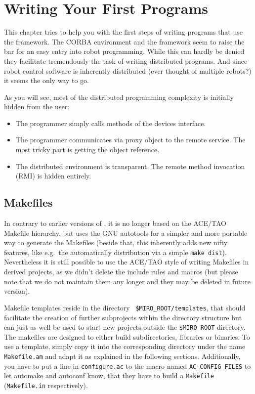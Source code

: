 \chapter{Writing Your First Programs}

This chapter tries to help you with the first steps of writing
programs that use the \miro framework. The CORBA environment and the
\miro framework seem to raise the bar for an easy entry into robot
programming. While this can hardly be denied they facilitate
tremendously the task of writing distributed programs. And since robot
control software is inherently distributed (ever thought of multiple
robots?) it seems the only way to go.

As you will see, most of the distributed programming complexity is
initially hidden from the user:

\begin{itemize}
\item The programmer simply calls methods of the devices interface.
\item The programmer communicates via proxy object to the remote
  service. The most tricky part is getting the object reference.
\item The distributed environment is transparent. The
  remote method invocation (RMI) is hidden entirely.
\end{itemize}


\section{Makefiles}
\label{sec:makefile}
In contrary to earlier versions of \miro, it is no longer based on the
ACE/TAO Makefile hierarchy, but uses the GNU autotools for a simpler
and more portable way to generate the Makefiles (beside that, this
inherently adds new nifty features, like e.g.\ the automatically
distribution via a simple \texttt{make dist}). Nevertheless it is
still possible to use the ACE/TAO style of writing Makefiles in
derived projects, as we didn't delete the \miro include rules and
macros (but please note that we do not maintain them any longer and
they may be deleted in future version).

Makefile templates reside in the directory {\tt
  \$MIRO\_ROOT/templates}, that should facilitate the creation of
further subprojects within the \miro directory structure but can just
as well be used to start new projects outside the {\tt \$MIRO\_ROOT}
directory. The makefiles are designed to either build subdirectories,
libraries or binaries. To use a template, simply copy it into the
corresponding directory under the name {\tt Makefile.am} and adapt it
as explained in the following sections. Additionally, you have to put
a line in \texttt{configure.ac} to the macro named
\texttt{AC\_CONFIG\_FILES} to let automake and autoconf know, that they
have to build a \texttt{Makefile} (\texttt{Makefile.in} respectively).


